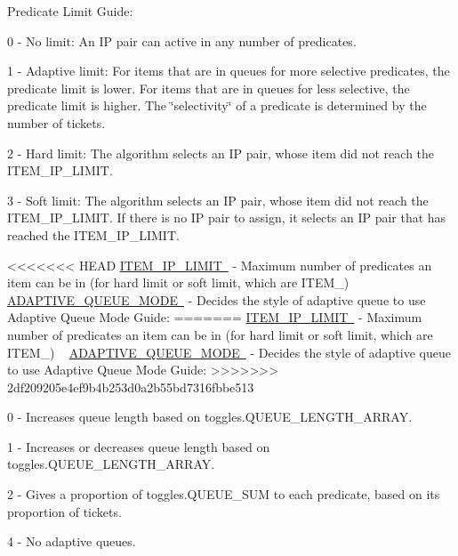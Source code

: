 Predicate Limit Guide\+:
\begin{DoxyItemize}
\item 0 -\/ No limit\+: An IP pair can active in any number of predicates.
\item 1 -\/ Adaptive limit\+: For items that are in queues for more selective predicates, the predicate limit is lower. For items that are in queues for less selective, the predicate limit is higher. The \char`\"{}selectivity\char`\"{} of a predicate is determined by the number of tickets.
\item 2 -\/ Hard limit\+: The algorithm selects an IP pair, whose item did not reach the I\+T\+E\+M\+\_\+\+I\+P\+\_\+\+L\+I\+M\+IT.
\item 3 -\/ Soft limit\+: The algorithm selects an IP pair, whose item did not reach the I\+T\+E\+M\+\_\+\+I\+P\+\_\+\+L\+I\+M\+IT. If there is no IP pair to assign, it selects an IP pair that has reached the I\+T\+E\+M\+\_\+\+I\+P\+\_\+\+L\+I\+M\+IT.
\end{DoxyItemize}

<<<<<<< HEAD
\mbox{\hyperlink{namespacedynamicfilterapp_1_1toggles_a755f2e9edbb8b4d5039a950757b9cfb2}{I\+T\+E\+M\+\_\+\+I\+P\+\_\+\+L\+I\+M\+IT }} -\/ Maximum number of predicates an item can be in (for hard limit or soft limit, which are I\+T\+E\+M\+\_\+) ~\newline
 \mbox{\hyperlink{namespacedynamicfilterapp_1_1toggles_ae5f3a5957b65dd5d074c52ef01e0f732}{A\+D\+A\+P\+T\+I\+V\+E\+\_\+\+Q\+U\+E\+U\+E\+\_\+\+M\+O\+DE }} -\/ Decides the style of adaptive queue to use Adaptive Queue Mode Guide\+:
=======
\mbox{\hyperlink{}{I\+T\+E\+M\+\_\+\+I\+P\+\_\+\+L\+I\+M\+IT }} -\/ Maximum number of predicates an item can be in (for hard limit or soft limit, which are I\+T\+E\+M\+\_\+) ~\newline
 \mbox{\hyperlink{}{A\+D\+A\+P\+T\+I\+V\+E\+\_\+\+Q\+U\+E\+U\+E\+\_\+\+M\+O\+DE }} -\/ Decides the style of adaptive queue to use Adaptive Queue Mode Guide\+:
>>>>>>> 2df209205e4ef9b4b253d0a2b55bd7316fbbe513
\begin{DoxyItemize}
\item 0 -\/ Increases queue length based on toggles.\+Q\+U\+E\+U\+E\+\_\+\+L\+E\+N\+G\+T\+H\+\_\+\+A\+R\+R\+AY.
\item 1 -\/ Increases or decreases queue length based on toggles.\+Q\+U\+E\+U\+E\+\_\+\+L\+E\+N\+G\+T\+H\+\_\+\+A\+R\+R\+AY.
\item 2 -\/ Gives a proportion of toggles.\+Q\+U\+E\+U\+E\+\_\+\+S\+UM to each predicate, based on its proportion of tickets.
\item 4 -\/ No adaptive queues.
\end{DoxyItemize}

